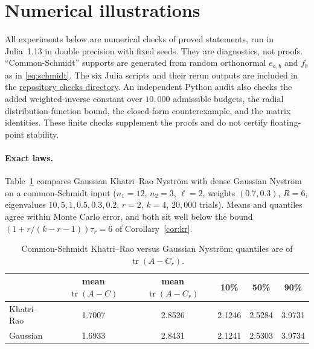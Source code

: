 \documentclass[11pt,a4paper]{article}
\theoremstyle{definition}
\theoremstyle{remark}
\numberwithin{equation}{section}
\newcommand{\tr}{\operatorname{tr}}
\begin{document}
\section{Numerical illustrations}\label{sec:numerics}

All experiments below are numerical checks of proved statements, run in
Julia~1.13 in double precision with fixed seeds. They are diagnostics, not
proofs. ``Common-Schmidt'' supports are generated from random orthonormal
$e_{a,b}$ and $f_b$ as in \eqref{eq:schmidt}. The six Julia scripts and their
rerun outputs are included in the
\href{https://github.com/DiarHaidary/Results/tree/main/manuscripts/03-Exact-Gaussian-Range-Laws/checks}{repository checks directory}.
An independent Python audit also checks the added weighted-inverse constant
over $10{,}000$ admissible budgets, the radial distribution-function bound,
the closed-form counterexample, and the matrix identities. These finite
checks supplement the proofs and do not certify floating-point stability.

\paragraph{Exact laws.} Table~\ref{tab:laws} compares Gaussian Khatri--Rao
Nystr\"om with dense Gaussian Nystr\"om on a common-Schmidt input
($n_1=12$, $n_2=3$, $\ell=2$, weights $(0.7,0.3)$, $R=6$, eigenvalues
$10,5,1,0.5,0.3,0.2$, $r=2$, $k=4$, $20{,}000$ trials). Means and quantiles
agree within Monte Carlo error, and both sit well below the bound
$(1+r/(k-r-1))\tau_r=6$ of Corollary~\ref{cor:kr}.

\begin{table}[htbp]
\centering\small
\begin{tabular}{@{}lccccc@{}}\toprule
& mean $\tr(A-C)$ & mean $\tr(A-C_r)$ & 10\% & 50\% & 90\%\\\midrule
Khatri--Rao & 1.7007 & 2.8526 & 2.1246 & 2.5284 & 3.9731\\
Gaussian    & 1.6933 & 2.8431 & 2.1241 & 2.5303 & 3.9734\\\bottomrule
\end{tabular}
\caption{Common-Schmidt Khatri--Rao versus Gaussian Nystr\"om; quantiles are of
$\tr(A-C_r)$.}
\label{tab:laws}
\end{table}
\end{document}
